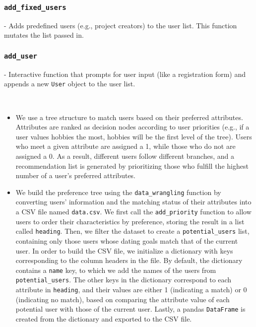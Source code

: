 \documentclass[fontsize=11pt]{article}
\begin{document}
\subsubsection*{\texttt{add\_fixed\_users}}
- Adds predefined users (e.g., project creators) to the user list. This function mutates the list passed in.

\subsubsection*{\texttt{add\_user}}
- Interactive function that prompts for user input (like a registration form) and appends a new \texttt{User} object to the user list.

\\


\begin{itemize}
\item We use a tree structure to match users based on their preferred attributes. Attributes are ranked as decision nodes according to user priorities (e.g., if a user values hobbies the most, hobbies will be the first level of the tree). Users who meet a given attribute are assigned a 1, while those who do not are assigned a 0. As a result, different users follow different branches, and a recommendation list is generated by prioritizing those who fulfill the highest number of a user's preferred attributes.
\\
\item We build the preference tree using the \texttt{data\_wrangling} function by converting users' information and the matching status of their attributes into a CSV file named \texttt{data.csv}. We first call the \texttt{add\_priority} function to allow users to order their characteristics by preference, storing the result in a list called \texttt{heading}. Then, we filter the dataset to create a \texttt{potential\_users} list, containing only those users whose dating goals match that of the current user. In order to build the CSV file, we initialize a dictionary with keys corresponding to the column headers in the file. By default, the dictionary contains a \texttt{name} key, to which we add the names of the users from \texttt{potential\_users}. The other keys in the dictionary correspond to each attribute in \texttt{heading}, and their values are either 1 (indicating a match) or 0 (indicating no match), based on comparing the attribute value of each potential user with those of the current user. Lastly, a pandas \texttt{DataFrame} is created from the dictionary and exported to the CSV file.

\end{itemize}
\end{document}

